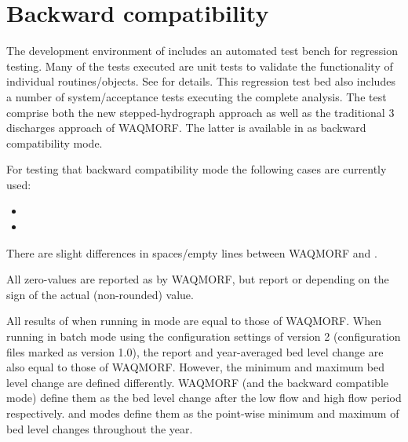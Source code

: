 \chapter{Backward compatibility} \label{Chp:Backward}

The development environment of \dfastmi includes an automated test bench for regression testing.
Many of the tests executed are unit tests to validate the functionality of individual routines/objects.
See \citet{trm} for details.
This regression test bed also includes a number of system/acceptance tests executing the complete \dfmi analysis.
The test comprise both the new stepped-hydrograph approach as well as the traditional 3 discharges approach of WAQMORF.
The latter is available in  as backward compatibility mode.

For testing that backward compatibility mode the following cases are currently used:

\begin{itemize}
\item {}
\item {}
\end{itemize}

\begin{Remark}
\item There are slight differences in spaces/empty lines between WAQMORF and \dfmi.
\item All zero-values are reported as  by WAQMORF, but \dfmi report  or  depending on the sign of the actual (non-rounded) value.
\item All results of \dfmi when running in  mode are equal to those of WAQMORF.
When \dfmi running in batch mode using the configuration settings of \dfmi version 2 (configuration files marked as version 1.0), the report and year-averaged bed level change are also equal to those of WAQMORF.
However, the minimum and maximum bed level change are defined differently.
WAQMORF (and the backward compatible \dfmi{}  mode) define them as the bed level change after the low flow and high flow period respectively.
\dfmi {} and  modes define them as the point-wise minimum and maximum of bed level changes throughout the year.
\end{Remark}

